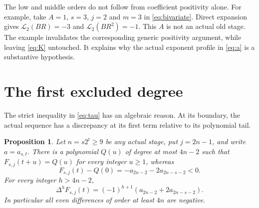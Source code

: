 \documentclass[11pt]{article}
\newtheorem{proposition}[theorem]{Proposition}
\newcommand{\Lfun}{\mathcal L}
\begin{document}
The low and middle orders do not follow from coefficient positivity
alone. For example, take $A=1$, $s=3$, $j=2$ and $m=3$ in
\eqref{eq:bivariate}. Direct expansion gives $\Lfun_2(BR)=-3$ and
$\Lfun_2(BR^2)=-1$. This $A$ is not an actual old stage. The example
invalidates the corresponding generic positivity argument, while
leaving \eqref{eq:K} untouched. It explains why the actual exponent
profile in \eqref{eq:a} is a substantive hypothesis.

\section{The first excluded degree}

The strict inequality in \eqref{eq:tau} has an algebraic reason.
At its boundary, the actual sequence has a discrepancy at its first
term relative to its polynomial tail.

\begin{proposition}\label{prop:boundary}
Let $n=s2^t\geq9$ be any actual stage, put $j=2n-1$, and write
$a=a_{s,t}$. There is a polynomial $Q(u)$ of degree at most $4n-2$ such
that $F_{s,j}(t+u)=Q(u)$ for every integer $u\geq1$, whereas
\begin{equation}\label{eq:discrepancy}
 F_{s,j}(t)-Q(0)=-a_{2n-2}-2a_{2n-s-2}<0.
\end{equation}
For every integer $h>4n-2$,
\begin{equation}\label{eq:boundarydiff}
 \Delta^hF_{s,j}(t)=(-1)^{h+1}(a_{2n-2}+2a_{2n-s-2}).
\end{equation}
In particular all even differences of order at least $4n$ are negative.
\end{proposition}
\end{document}
